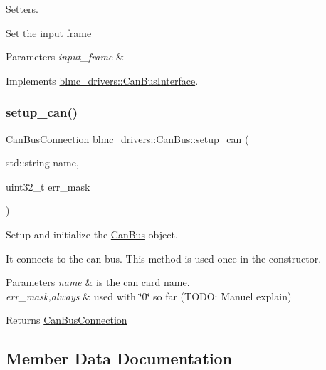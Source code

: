Setters. 

Set the input frame


\begin{DoxyParams}{Parameters}
{\em input\+\_\+frame} & \\
\hline
\end{DoxyParams}


Implements \hyperlink{classblmc__drivers_1_1CanBusInterface_acf9305b548421e837950a0988172d57a}{blmc\+\_\+drivers\+::\+Can\+Bus\+Interface}.

\mbox{\label{classblmc__drivers_1_1CanBus_a86826b4acc0833e041e6ea02824f8d48}} 
\subsubsection{\texorpdfstring{setup\+\_\+can()}{setup\_can()}}
{\footnotesize\ttfamily \hyperlink{classblmc__drivers_1_1CanBusConnection}{Can\+Bus\+Connection} blmc\+\_\+drivers\+::\+Can\+Bus\+::setup\+\_\+can (\begin{DoxyParamCaption}\item[{std\+::string}]{name,  }\item[{uint32\+\_\+t}]{err\+\_\+mask }\end{DoxyParamCaption})\hspace{0.3cm}{\ttfamily [private]}}



Setup and initialize the \hyperlink{classblmc__drivers_1_1CanBus}{Can\+Bus} object. 

It connects to the can bus. This method is used once in the constructor.


\begin{DoxyParams}{Parameters}
{\em name} & is the can card name. \\
\hline
{\em err\+\_\+mask,always} & used with \char`\"{}0\char`\"{} so far (T\+O\+DO\+: Manuel explain) \\
\hline
\end{DoxyParams}
\begin{DoxyReturn}{Returns}
\hyperlink{classblmc__drivers_1_1CanBusConnection}{Can\+Bus\+Connection} 
\end{DoxyReturn}


\subsection{Member Data Documentation}
\mbox{\label{classblmc__drivers_1_1CanBus_a996c9b1bc46071b2d002de38d6e9f781}} 
